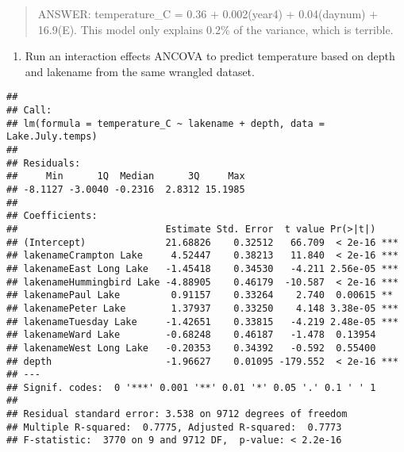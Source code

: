 \documentclass[]{article}
\newenvironment{Shaded}{\begin{snugshade}}{\end{snugshade}}
\newcommand{\KeywordTok}[1]{\textcolor[rgb]{0.13,0.29,0.53}{\textbf{#1}}}
\newcommand{\DataTypeTok}[1]{\textcolor[rgb]{0.13,0.29,0.53}{#1}}
\newcommand{\StringTok}[1]{\textcolor[rgb]{0.31,0.60,0.02}{#1}}
\newcommand{\CommentTok}[1]{\textcolor[rgb]{0.56,0.35,0.01}{\textit{#1}}}
\newcommand{\OperatorTok}[1]{\textcolor[rgb]{0.81,0.36,0.00}{\textbf{#1}}}
\newcommand{\NormalTok}[1]{#1}
\providecommand{\tightlist}{%
  \setlength{\itemsep}{0pt}\setlength{\parskip}{0pt}}
\begin{document}
\begin{quote}
ANSWER: temperature\_C = 0.36 + 0.002(year4) + 0.04(daynum) + 16.9(E).
This model only explains 0.2\% of the variance, which is terrible.
\end{quote}

\begin{enumerate}
\def\labelenumi{\arabic{enumi}.}
\setcounter{enumi}{13}
\tightlist
\item
  Run an interaction effects ANCOVA to predict temperature based on
  depth and lakename from the same wrangled dataset.
\end{enumerate}

\begin{Shaded}
\end{Shaded}

\begin{verbatim}
## 
## Call:
## lm(formula = temperature_C ~ lakename + depth, data = Lake.July.temps)
## 
## Residuals:
##     Min      1Q  Median      3Q     Max 
## -8.1127 -3.0040 -0.2316  2.8312 15.1985 
## 
## Coefficients:
##                          Estimate Std. Error  t value Pr(>|t|)    
## (Intercept)              21.68826    0.32512   66.709  < 2e-16 ***
## lakenameCrampton Lake     4.52447    0.38213   11.840  < 2e-16 ***
## lakenameEast Long Lake   -1.45418    0.34530   -4.211 2.56e-05 ***
## lakenameHummingbird Lake -4.88905    0.46179  -10.587  < 2e-16 ***
## lakenamePaul Lake         0.91157    0.33264    2.740  0.00615 ** 
## lakenamePeter Lake        1.37937    0.33250    4.148 3.38e-05 ***
## lakenameTuesday Lake     -1.42651    0.33815   -4.219 2.48e-05 ***
## lakenameWard Lake        -0.68248    0.46187   -1.478  0.13954    
## lakenameWest Long Lake   -0.20353    0.34392   -0.592  0.55400    
## depth                    -1.96627    0.01095 -179.552  < 2e-16 ***
## ---
## Signif. codes:  0 '***' 0.001 '**' 0.01 '*' 0.05 '.' 0.1 ' ' 1
## 
## Residual standard error: 3.538 on 9712 degrees of freedom
## Multiple R-squared:  0.7775, Adjusted R-squared:  0.7773 
## F-statistic:  3770 on 9 and 9712 DF,  p-value: < 2.2e-16
\end{verbatim}
\end{document}
